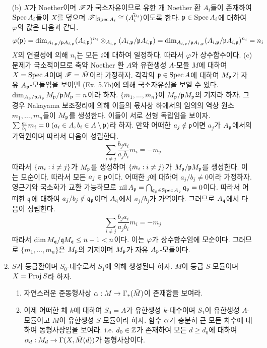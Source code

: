 \begin{enumerate}[label=\tb{5.\arabic*.},itemindent=0mm,itemsep=4mm]
	(b) $X$가 Noether이며 $\mathscr{F}$가 국소자유이므로 유한 개 Noether 환 $A_i$들이 존재하여 $\operatorname{Spec} A_i$들이 $X$를 덮으며
	$\mathscr{F}|_{\operatorname{Spec} A_i}\cong\tilde{(A_i^{n_i})}$이도록 한다.
	$\mathfrak{p}\in\operatorname{Spec} A_i$에 대하여 $\varphi$의 값은 다음과 같다.
	$$\varphi(\mathfrak{p})=\dim_{A_{i,\mathfrak{p}}/\mathfrak{p}A_{i,\mathfrak{p}}}(A_{i,\mathfrak{p}})^{n_i}\otimes_{A_{i,\mathfrak{p}}}(A_{i,\mathfrak{p}}/\mathfrak{p}A_{i,\mathfrak{p}})
	=\dim_{A_{i,\mathfrak{p}}/\mathfrak{p}A_{i,\mathfrak{p}}}(A_{i,\mathfrak{p}}/\mathfrak{p}A_{i,\mathfrak{p}})^{n_i}=n_i$$
	$X$의 연결성에 의해 $n_i$는 모든 $i$에 대하여 일정하다. 따라서 $\varphi$가 상수함수이다.
	(c) 문제가 국소적이므로 축약 Noether 환 $A$와 유한생성 $A$-모듈 $M$에 대하여 $X=\operatorname{Spec} A$이며 $\mathscr{F}=\tilde M$이라 가정하자.
	각각의 $\mathfrak{p}\in\operatorname{Spec} A$에 대하여 $M_{\mathfrak{p}}$가 자유 $A_{\mathfrak{p}}$-모듈임을 보이면 (Ex. 5.7b)에 의해 국소자유성을 보일 수 있다.
	$\dim_{A_{\mathfrak{p}}/\mathfrak{p}A_{\mathfrak{p}}}M_{\mathfrak{p}}/\mathfrak{p}M_{\mathfrak{p}}=n$이라 하자.
	$\{\bar m_1,\ldots,\bar m_n\}$이 $M_{\mathfrak{p}}/\mathfrak{p}M_{\mathfrak{p}}$의 기저라 하자.
	그 경우 Nakayama 보조정리에 의해 이들의 몫사상 하에서의 임의의 역상 원소 $m_1,\ldots,m_n$들이 $M_{\mathfrak{p}}$를 생성한다.
	이들이 서로 선형 독립임을 보이자. $\sum\frac{a_i}{b_i}m_i=0\;(a_i\in A,b_i\in A\setminus\mathfrak{p})$라 하자.
	만약 어떠한 $a_j\notin\mathfrak{p}$이면 $a_j$가 $A_{\mathfrak{p}}$에서의 가역원이며 따라서 다음이 성립한다.
	$$\sum_{i\ne j}\frac{b_ja_i}{a_jb_i}m_i=-m_j$$
	따라서 $\{m_i:i\ne j\}$가 $M_{\mathfrak{p}}$를 생성하며 $\{\bar m_i:i\ne j\}$가 $M_{\mathfrak{p}}/\mathfrak{p}M_{\mathfrak{p}}$를 생성한다.
	이는 모순이다. 따라서 모든 $a_j\in\mathfrak{p}$이다. 어떠한 $j$에 대하여 $a_j/b_j\ne 0$이라 가정하자.
	영근기와 국소화가 교환 가능하므로 $\operatorname{nil} A_{\mathfrak{p}}=\bigcap_{\mathfrak{q}_{\mathfrak{p}}\in\operatorname{Spec} A_{\mathfrak{p}}}\mathfrak{q}_{\mathfrak{p}}=0$이다.
	따라서 어떠한 $\mathfrak{q}$에 대하여 $a_j/b_j\notin\mathfrak{q}_{\mathfrak{p}}$이며 $A_{\mathfrak{q}}$에서 $a_j/b_j$가 가역이다.
	그러므로 $A_{\mathfrak{q}}$에서 다음이 성립한다.
	$$\sum_{i\ne j}\frac{b_ja_i}{a_jb_i}m_i=-m_j$$
	따라서 $\dim M_{\mathfrak{q}}/\mathfrak{q}M_{\mathfrak{q}}\le n-1<n$이다. 이는 $\varphi$가 상수함수임에 모순이다.
	그러므로 $\{m_1,\ldots,m_n\}$은 $M_{\mathfrak{p}}$의 기저이며 $M_{\mathfrak{p}}$가 자유 $A_{\mathfrak{p}}$-모듈이다.
	\item $S$가 등급환이며 $S_0$-대수로서 $S_1$에 의해 생성된다 하자. $M$이 등급 $S$-모듈이며 $X=\operatorname{Proj} S$라 하자.
	\begin{enumerate}[label=(\alph*)]
	\item 자연스러운 준동형사상 $\alpha:M\rightarrow\Gamma_*(\tilde M)$이 존재함을 보여라.
	\item 이제 어떠한 체 $k$에 대하여 $S_0=A$가 유한생성 $k$-대수이며 $S_1$이 유한생성 $A$-모듈이고 $M$이 유한생성 $S$-모듈이라 하자.
	함수 $\alpha$가 충분히 큰 모든 차수에 대하여 동형사상임을 보여라.
	i.e. $d_0\in\mathbb Z$가 존재하여 모든 $d\ge d_0$에 대하여 $\alpha_d:M_d\rightarrow\Gamma(X,\tilde M(d))$가 동형사상이다.

\end{enumerate}
\end{enumerate}
